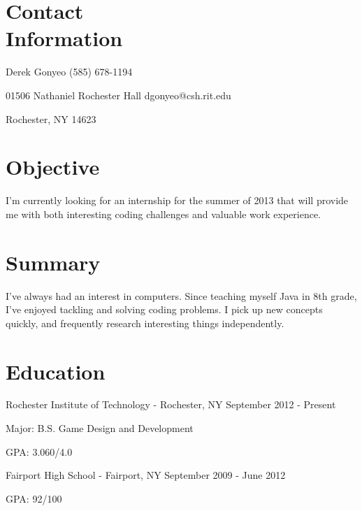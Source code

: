 \documentclass[a4paper,margin,line]{resume}
\newcommand{\rdate}[1]{\hfill {\small #1}}
\begin{document}
\begin{resume}
\section{\mysidestyle Contact \\ Information} \vspace{2mm}
	\begin{asparablank}
		\item Derek Gonyeo \hfill (585) 678-1194
		\item 01506 Nathaniel Rochester Hall \hfill dgonyeo@csh.rit.edu
		\item Rochester, NY 14623
	\end{asparablank}

\section{\mysidestyle Objective}
	I'm currently looking for an internship for the summer of 2013 that will provide me with both interesting coding challenges and valuable work experience.

\section{\mysidestyle Summary}
        I've always had an interest in computers. Since teaching myself Java in 8th grade, I've enjoyed tackling and solving coding problems. I pick up new concepts quickly, and frequently research interesting things independently.

\section{\mysidestyle Education}
	\begin{compactdesc}
		\item[Rochester Institute of Technology] - Rochester, NY \rdate{September 2012 - Present}
		\begin{compactitem} { \small
			\item Major: B.S. Game Design and Development
			\item GPA: 3.060/4.0
		} \end{compactitem}
                \item[Fairport High School] - Fairport, NY \rdate{September 2009 - June 2012}
                \begin{compactitem} {\small
                        \item GPA: 92/100
                } \end{compactitem}
	\end{compactdesc}


\end{resume}
\end{document}
